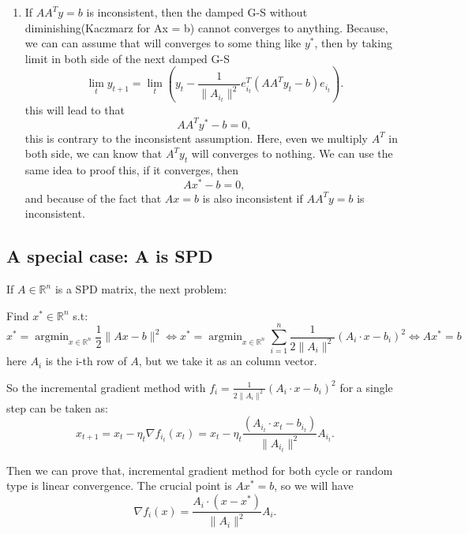 \begin{enumerate}
	\item If $AA^T y = b$ is inconsistent, then the damped G-S without diminishing(Kaczmarz for Ax = b)  cannot converges to anything. Because, we can can assume that will converges to some thing like $y^*$, then by taking limit in both side of the next damped G-S 
	\begin{equation}
	\lim_{t} y_{t+1} = \lim_t (y_t -  \frac{1}{\|A_{i_t}\|^2}e_{i_t}^T(AA^Ty_t - b) e_{i_t}). 
	\end{equation}
	this will lead to that 
	$$
	AA^Ty^* - b = 0,
	$$
	this is contrary to the inconsistent assumption. Here, even we multiply $A^T$ in both side, we can know that $A^T y_t$ will converges to nothing. We can use the same idea to proof this, if it converges, then
	$$
	Ax^* - b = 0,
	$$
	and because of the fact that $A x = b$ is also inconsistent if $AA^T y = b$ is inconsistent. 
\end{enumerate}


\subsection{A special case: A is SPD}
If $A \in \mathbb{R}^n$ is a SPD matrix, the next problem: 
\begin{problem}\label{pro:standerLS}
	Find ${x}^{*} \in \mathbb{R}^{n}$  s.t:
	\begin{equation}\label{equ:spd-opt-equ}
	{x}^* = \mathop{\arg\min}_{{x} \in \mathbb{R}^{n}} \frac{1}{2}\|A {x} - b\|^2 \Leftrightarrow {x}^* = \mathop{\arg\min}_{{x} \in \mathbb{R}^{n}} \sum_{i=1}^n\frac{1}{2\|A_i\|^2}(A_i \cdot {x} - b_i)^2 \Leftrightarrow Ax^{*} = b
	\end{equation}
	here $A_i$ is the i-th row of $A$, but we take it as an column vector. 
\end{problem}
So the incremental gradient method  with $f_i = \frac{1}{2\|A_i\|^2}(A_i \cdot {x} - b_i)^2$ for a single step can be taken as:
\begin{equation}
x_{t+1} = x_t - \eta_t \nabla f_{i_t}(x_t) = x_t - \eta_t \frac{(A_{i_t} \cdot x_t - b_{i_t})}{\|A_{i_t}\|^2}A_{i_t}.
\end{equation}

Then we can prove that, incremental gradient method for both cycle or random type is linear convergence. The crucial point is $Ax^* = b$, so we will have
\begin{equation}
\nabla f_i(x) = \frac{A_i \cdot (x - x^*)}{\|A_i\|^2}A_i.
\end{equation}

